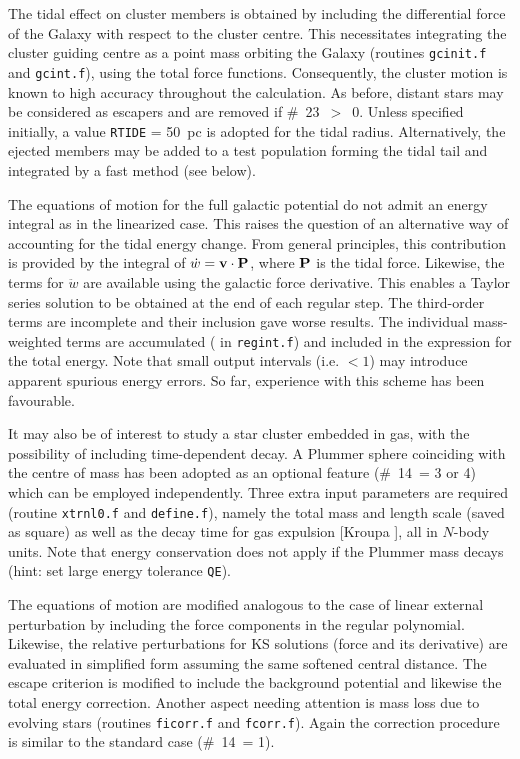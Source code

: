 \documentclass[12pt]{article}
\begin{document}
The tidal effect on cluster members is obtained by including the
differential force of the Galaxy with respect to the cluster centre.
This necessitates integrating the cluster guiding centre as a point mass
orbiting the Galaxy (routines {\tt gcinit.f} and {\tt gcint.f}), using the
total force functions.
Consequently, the cluster motion is known to high accuracy throughout
the calculation.
As before, distant stars may be considered as escapers and are removed if
\#~23~$>$~0.
Unless specified initially, a value {\tt RTIDE} = 50~pc is adopted for
the tidal radius.
Alternatively, the ejected members may be added to a test population forming
the tidal tail and integrated by a fast method (see below).

The equations of motion for the full galactic potential do not admit an
energy integral as in the linearized case.
This raises the question of an alternative way of accounting for the tidal
energy change.
From general principles, this contribution is provided by the integral of
$\dot w = {\bf v} \cdot {\bf P}$, where ${\bf P}$ is the tidal force.
Likewise, the terms for ${\ddot w}$ are available using the galactic force
derivative.
This enables a Taylor series solution to be obtained at the end of each
regular step.
The third-order terms are incomplete and their inclusion gave worse results.
The individual mass-weighted terms are accumulated ( in
{\tt regint.f}) and included in the expression for the total energy.
Note that small output intervals (i.e. $< 1$) may introduce apparent
spurious energy errors.
So far, experience with this scheme has been favourable.

It may also be of interest to study a star cluster embedded in gas,
with the possibility of including time-dependent decay.
A Plummer sphere coinciding with the centre of mass has been adopted as
an optional feature (\#~14~= 3 or 4) which can be employed independently.
Three extra input parameters are required (\cf routine {\tt xtrnl0.f} and
{\tt define.f}), namely the total mass and length scale (saved as square)
as well as the decay time for gas expulsion [Kroupa ], all in
$N$-body units. Note that energy conservation does not apply if the
Plummer mass decays (hint: set large energy tolerance {\tt QE}).

The equations of motion are modified analogous to the case of linear
external perturbation by including the force components in the regular
polynomial.
Likewise, the relative perturbations for KS solutions (force and its
derivative) are evaluated in simplified form assuming the same softened
central distance.
The escape criterion is modified to include the background potential
and likewise the total energy correction.
Another aspect needing attention is mass loss due to evolving stars
(routines {\tt ficorr.f} and {\tt fcorr.f}).
Again the correction procedure is similar to the standard case
(\#~14~= 1).
\end{document}
